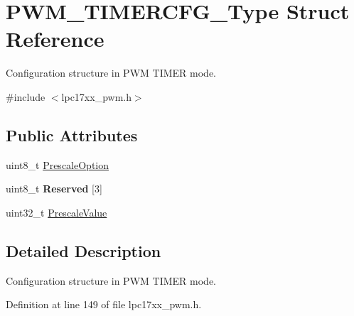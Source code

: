 \hypertarget{struct_p_w_m___t_i_m_e_r_c_f_g___type}{\section{\-P\-W\-M\-\_\-\-T\-I\-M\-E\-R\-C\-F\-G\-\_\-\-Type \-Struct \-Reference}
\label{struct_p_w_m___t_i_m_e_r_c_f_g___type}
}


\-Configuration structure in \-P\-W\-M \-T\-I\-M\-E\-R mode.  




{\ttfamily \#include $<$lpc17xx\-\_\-pwm.\-h$>$}

\subsection*{\-Public \-Attributes}
\begin{DoxyCompactItemize}
\item 
uint8\-\_\-t \hyperlink{struct_p_w_m___t_i_m_e_r_c_f_g___type_ab3b87526b058fcae841151dc3310a7ce}{\-Prescale\-Option}
\item 
\hypertarget{struct_p_w_m___t_i_m_e_r_c_f_g___type_a542f421c5c3877f4fcf503c4a961042a}{uint8\-\_\-t {\bfseries \-Reserved} \mbox{[}3\mbox{]}}\label{struct_p_w_m___t_i_m_e_r_c_f_g___type_a542f421c5c3877f4fcf503c4a961042a}

\item 
uint32\-\_\-t \hyperlink{struct_p_w_m___t_i_m_e_r_c_f_g___type_a8581b0f1aeb123358bf3cfa03d8b60c8}{\-Prescale\-Value}
\end{DoxyCompactItemize}


\subsection{\-Detailed \-Description}
\-Configuration structure in \-P\-W\-M \-T\-I\-M\-E\-R mode. 

\-Definition at line 149 of file lpc17xx\-\_\-pwm.\-h.



